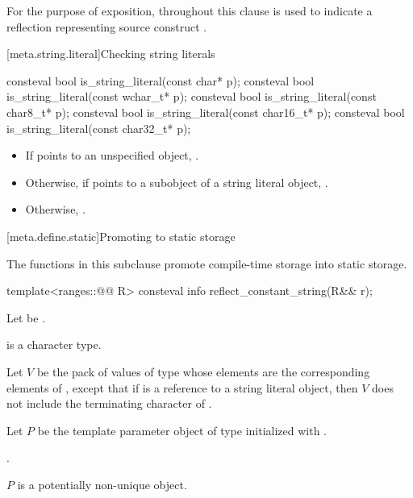 \pnum
For the purpose of exposition,
throughout this clause  is used
to indicate a reflection representing source construct .

[meta.string.literal]{Checking string literals}

%
\begin{itemdecl}
consteval bool is_string_literal(const char* p);
consteval bool is_string_literal(const wchar_t* p);
consteval bool is_string_literal(const char8_t* p);
consteval bool is_string_literal(const char16_t* p);
consteval bool is_string_literal(const char32_t* p);
\end{itemdecl}

\begin{itemdescr}
\pnum
\returns
\begin{itemize}
\item
  If  points to an unspecified object,
  .
\item
  Otherwise, if  points to a subobject
  of a string literal object,
  .
\item
  Otherwise, .
\end{itemize}
\end{itemdescr}

[meta.define.static]{Promoting to static storage}

\pnum
The functions in this subclause promote compile-time storage into static storage.

%
\begin{itemdecl}
template<ranges::@@ R>
  consteval info reflect_constant_string(R&& r);
\end{itemdecl}

\begin{itemdescr}
\pnum
Let  be .

\pnum
\mandates
{} is a character type.

\pnum
Let $V$ be the pack of values of type 
whose elements are the corresponding elements of ,
except that if  is a reference to a string literal object,
then $V$ does not include the terminating  character of .

\pnum
Let $P$ be the template parameter object
of type 
initialized with .

\pnum
\returns
{}.

\pnum
\begin{note}
$P$ is a potentially non-unique object.
\end{note}
\end{itemdescr}

